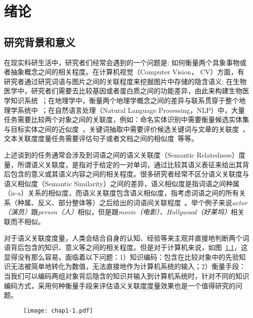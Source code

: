 \chapter{绪论}
\label{chap:chap01}

\section{研究背景和意义}
在现实科研生活中，研究者们经常会遇到的一个问题是: 如何衡量两个具象事物或者抽象概念之间的相关程度。在计算机视觉（Computer Vision， CV）方面，有研究者通过研究词语与图片之间的关联程度来挖掘图片中存储的隐含语义\cite{iwcs/LeongM11}; 在生物医学中，研究者们需要去比较基因或者蛋白质之间的功能差异，由此来构建生物医学知识系统~\cite{bib/GuzziMGC12,bmcbi/BenabderrahmaneSPND10}；在地理学中，衡量两个地理学概念之间的差异与联系贯穿于整个地理学系统中~\cite{josis/JanowiczRK11,tanyongbin2013}；在自然语言处理（Natural Language Processing，NLP）中，大量任务需要比较两个对象之间的关联度，例如：命名实体识别中需要衡量候选实体集与目标实体之间的近似度~\cite{zhangxiaoyan2005,acl/HanZ10}，关键词抽取中需要评价候选关键词与文章的关联度~\cite{lisujian2004,ijcai/ZhangFW13}，文本关联度度量任务需要评估句子或者文档之间的相似度~\cite{ijcai/YazdaniP13}等等。

上述谈到的任务通常会涉及到词语之间的语义关联度（Semantic Relatedness）度量，所谓语义关联度，是指对于给定的一对单词，通过比较其语义表征来给出其背后包含的意义或其语义内容之间的相关程度。很多研究者经常不区分语义关联度与语义相似度（Semantic Similarity）之间的差异，语义相似度是指词语之间种属（is-a）关系的相似度，而语义关联度包含语义相似度，指考虑词语之间的所有关系（种属、反义、部分整体等）之后给出的词语间关联程度~\cite{geoinformatica/BallatoreBW14}。举个例子来说\emph{actor（演员）}跟\emph{person（人）}相似，但是跟\emph{movie（电影）、Hollywood（好莱坞）}相关联而不相似。

对于语义关联度度量，人类会结合自身的认知、经验等来主观并直接地判断两个词语背后包含的知识、意义等之间的相关程度。但是对于计算机来说，如图~\ref{chap1-1}，这显得没有那么容易，面临着以下问题：1）知识编码：包含在比较对象中的先验知识无法被简单地转化为数值，无法直接地作为计算机系统的输入；2）衡量手段：当我们可以编码两组对象背后隐含的知识并输入到计算机系统时，针对不同的知识编码方式，采用何种衡量手段来评估语义关联度度量效果也是一个值得研究的问题。

\begin{figure}[!ht]
    \centerline{\texttt{[image: chap1-1.pdf]}}
    \label{chap1-1}
\end{figure}

